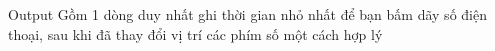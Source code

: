 Output
Gồm 1 dòng duy nhất ghi thời gian nhỏ nhất để bạn bấm dãy số điện thoại, sau khi đã thay đổi vị trí các phím số một cách hợp lý